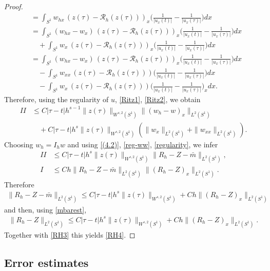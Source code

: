 \documentclass[a4paper,10pt]{article}
\numberwithin{equation}{section}
\begin{document}
\begin{proof}
\begin{align*}
&=\int_{S^{1}} w_{hx}\,(z(\tau)-\mathcal{R}_{h}(z(\tau)))_{x} \Big(\frac{1}{|u_{x}(t)|} - \frac{1}{|u_{x}(\tau)|} \Big) dx\\
&=\int_{S^{1}} (w_{hx}-w_{x})\,(z(\tau)-\mathcal{R}_{h}(z(\tau)))_{x} \Big(\frac{1}{|u_{x}(t)|} - \frac{1}{|u_{x}(\tau)|} \Big) dx \\
& \quad +
\int_{S^{1}} w_{x}\,(z(\tau)-\mathcal{R}_{h}(z(\tau)))_{x} \Big(\frac{1}{|u_{x}(t)|} - \frac{1}{|u_{x}(\tau)|} \Big) dx\\
& =
\int_{S^{1}} (w_{hx}-w_{x})\,(z(\tau)-\mathcal{R}_{h}(z(\tau)))_{x} \Big(\frac{1}{|u_{x}(t)|} - \frac{1}{|u_{x}(\tau)|} \Big) dx \\
&\quad -\int_{S^{1}} w_{xx}\,(z(\tau)-\mathcal{R}_{h}(z(\tau))) \Big(\frac{1}{|u_{x}(t)|} - \frac{1}{|u_{x}(\tau)|} \Big) dx \\
& \quad- \int_{S^{1}} w_{x}\,(z(\tau)-\mathcal{R}_{h}(z(\tau))) \Big(\frac{1}{|u_{x}(t)|} - \frac{1}{|u_{x}(\tau)|} \Big)_{x} dx.
\end{align*}
Therefore, using the regularity of $u$, \eqref{Ritz1}, \eqref{Ritz2}, we obtain
\begin{align*}
II &\leq C|\tau-t|h^{s-1}\| z(\tau)\|_{W^{s,2}(S^{1})} \|( w_{h} -w)_{x}\|_{L^{2}(S^{1})} \\
& \quad + C|\tau-t|h^{s}\| z(\tau)\|_{W^{s,2}(S^{1})} (\|w_{x}\|_{L^{2}(S^{1})} + \|w_{xx}\|_{L^{2}(S^{1})}).
\end{align*}
Choosing $w_{h}=I_{h}w$ and using \eqref{(4.2)}, \eqref{reg-ww}, \eqref{regularity}, we infer
\begin{align*}
II &\leq C|\tau-t|h^{s}\| z(\tau)\|_{W^{s,2}(S^{1})} \| R_{h}-Z -\bar{m} \|_{L^{2}(S^{1})},\\
I & \leq Ch\| R_{h}-Z -\bar{m} \|_{L^{2}(S^{1})} \| (R_{h}-Z)_{x}\|_{L^{2}(S^{1})}.
\end{align*}
Therefore
\begin{align*}
\| R_{h}-Z -\bar{m} \|_{L^{2}(S^{1})} \leq C|\tau-t|h^{s}\| z(\tau)\|_{W^{s,2}(S^{1})} + Ch
\| (R_{h}-Z)_{x}\|_{L^{2}(S^{1})}
\end{align*}
and then, using \eqref{mbarest},
\begin{align*}
\| R_{h}-Z \|_{L^{2}(S^{1})} \leq C|\tau-t|h^{s}\| z(\tau)\|_{W^{s,2}(S^{1})} + Ch
\| (R_{h}-Z)_{x}\|_{L^{2}(S^{1})}. 
\end{align*}
Together with \eqref{RH3} this yields \eqref{RH4}.
\end{proof}


\subsection{Error estimates}
\end{document}
